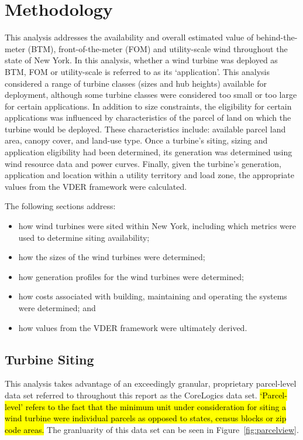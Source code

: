 \section{Methodology}
\label{meth}

This analysis addresses the availability and overall estimated value of behind-the-meter (BTM), front-of-the-meter (FOM) and utility-scale wind throughout the state of New York. In this analysis, whether a wind turbine was deployed as BTM, FOM or utility-scale is referred to as its `application'. This analysis considered a range of turbine classes (sizes and hub heights) available for deployment, although some turbine classes were considered too small or too large for certain applications. In addition to size constraints, the eligibility for certain applications was influenced by characteristics of the parcel of land on which the turbine would be deployed. These characteristics include: available parcel land area, canopy cover, and land-use type. Once a turbine's siting, sizing and application eligibility had been determined, its generation was determined using wind resource data and power curves. Finally, given the turbine's generation, application and location within a utility territory and load zone, the appropriate values from the VDER framework were calculated.


The following sections address: 
	\begin{itemize}
		\item how wind turbines were sited within New York, including which metrics were used to determine siting availability; 
		\item how the sizes of the wind turbines were determined; 
		\item how generation profiles for the wind turbines were determined; 
		\item how costs associated with building, maintaining and operating the systems were determined; and 
		\item how values from the VDER framework were ultimately derived.
	\end{itemize}

\subsection{Turbine Siting}
\label{meth_siting}

This analysis takes advantage of an exceedingly granular, proprietary parcel-level data set referred to throughout this report as the CoreLogics data set. \hl{`Parcel-level' refers to the fact that the minimum unit under consideration for siting a wind turbine were individual parcels as opposed to states, census blocks or zip code areas.} The granluarity of this data set can be seen in Figure~\ref{fig:parcelview}. 

